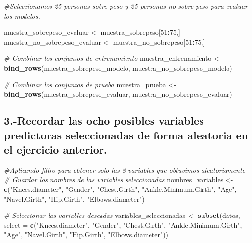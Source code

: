 \documentclass[
]{article}
\newenvironment{Shaded}{\begin{snugshade}}{\end{snugshade}}
\newcommand{\AttributeTok}[1]{\textcolor[rgb]{0.13,0.29,0.53}{#1}}
\newcommand{\CommentTok}[1]{\textcolor[rgb]{0.56,0.35,0.01}{\textit{#1}}}
\newcommand{\DecValTok}[1]{\textcolor[rgb]{0.00,0.00,0.81}{#1}}
\newcommand{\FunctionTok}[1]{\textcolor[rgb]{0.13,0.29,0.53}{\textbf{#1}}}
\newcommand{\NormalTok}[1]{#1}
\newcommand{\OtherTok}[1]{\textcolor[rgb]{0.56,0.35,0.01}{#1}}
\newcommand{\SpecialCharTok}[1]{\textcolor[rgb]{0.81,0.36,0.00}{\textbf{#1}}}
\newcommand{\StringTok}[1]{\textcolor[rgb]{0.31,0.60,0.02}{#1}}
\begin{document}
\begin{Shaded}
\begin{Highlighting}[]
\CommentTok{\#Seleccionamos 25 personas sobre peso y 25 personas no sobre peso para evaluar los modelos.}

\NormalTok{muestra\_sobrepeso\_evaluar }\OtherTok{\textless{}{-}}\NormalTok{ muestra\_sobrepeso[}\DecValTok{51}\SpecialCharTok{:}\DecValTok{75}\NormalTok{,]}
\NormalTok{muestra\_no\_sobrepeso\_evaluar }\OtherTok{\textless{}{-}}\NormalTok{ muestra\_no\_sobrepeso[}\DecValTok{51}\SpecialCharTok{:}\DecValTok{75}\NormalTok{,]}

\CommentTok{\# Combinar los conjuntos de entrenamiento}
\NormalTok{muestra\_entrenamiento }\OtherTok{\textless{}{-}} \FunctionTok{bind\_rows}\NormalTok{(muestra\_sobrepeso\_modelo, muestra\_no\_sobrepeso\_modelo)}

\CommentTok{\# Combinar los conjuntos de prueba}
\NormalTok{muestra\_prueba }\OtherTok{\textless{}{-}} \FunctionTok{bind\_rows}\NormalTok{(muestra\_sobrepeso\_evaluar, muestra\_no\_sobrepeso\_evaluar)}
\end{Highlighting}
\end{Shaded}

\subsection{3.-Recordar las ocho posibles variables predictoras
seleccionadas de forma aleatoria en el ejercicio
anterior.}\label{recordar-las-ocho-posibles-variables-predictoras-seleccionadas-de-forma-aleatoria-en-el-ejercicio-anterior.}

\begin{Shaded}
\begin{Highlighting}[]
\CommentTok{\#Aplicando filtro para obtener solo las 8 variables que obtuvimos aleatoriamente}
\CommentTok{\# Guardar los nombres de las variables seleccionadas}
\NormalTok{nombres\_variables }\OtherTok{\textless{}{-}} \FunctionTok{c}\NormalTok{(}\StringTok{"Knees.diameter"}\NormalTok{, }\StringTok{"Gender"}\NormalTok{, }\StringTok{"Chest.Girth"}\NormalTok{, }
                       \StringTok{"Ankle.Minimum.Girth"}\NormalTok{, }\StringTok{"Age"}\NormalTok{, }
                       \StringTok{"Navel.Girth"}\NormalTok{, }\StringTok{"Hip.Girth"}\NormalTok{, }
                       \StringTok{"Elbows.diameter"}\NormalTok{)}

\CommentTok{\# Seleccionar las variables deseadas}
\NormalTok{variables\_seleccionadas }\OtherTok{\textless{}{-}} \FunctionTok{subset}\NormalTok{(datos, }\AttributeTok{select =} \FunctionTok{c}\NormalTok{(}\StringTok{"Knees.diameter"}\NormalTok{, }\StringTok{"Gender"}\NormalTok{, }\StringTok{"Chest.Girth"}\NormalTok{, }
                                                      \StringTok{"Ankle.Minimum.Girth"}\NormalTok{, }\StringTok{"Age"}\NormalTok{, }
                                                      \StringTok{"Navel.Girth"}\NormalTok{, }\StringTok{"Hip.Girth"}\NormalTok{, }
                                                      \StringTok{"Elbows.diameter"}\NormalTok{))}
\end{Highlighting}
\end{Shaded}
\end{document}
